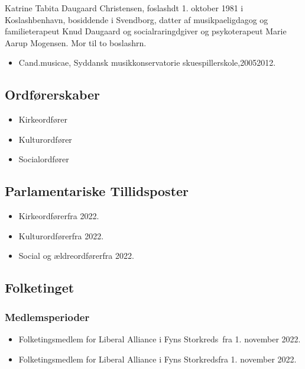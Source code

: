 \documentclass[11pt, a4paper]{awesome-cv}
\begin{document}
\makecvheader[R]
\makelettertitle
\begin{cvletter}
Katrine Tabita Daugaard Christensen, foslashdt 1. oktober 1981 i Koslashbenhavn, bosiddende i Svendborg, datter af musikpaeligdagog og familieterapeut Knud Daugaard og socialraringdgiver og psykoterapeut Marie Aarup Mogensen. Mor til to boslashrn.

\begin{itemize}
\item Cand.musicae, Syddansk musikkonservatorie  skuespillerskole,20052012.
\end{itemize}
\subsection*{Ordførerskaber}
\begin{itemize}
\item Kirkeordfører
\item Kulturordfører
\item Socialordfører
\end{itemize}
\subsection*{Parlamentariske Tillidsposter}
\begin{itemize}
\item Kirkeordførerfra 2022.
\item Kulturordførerfra 2022.
\item Social og ældreordførerfra 2022.
\end{itemize}
\subsection*{Folketinget}
\subsubsection*{Medlemsperioder}
\begin{itemize}
\item Folketingsmedlem for Liberal Alliance i Fyns Storkreds fra 1. november 2022.
\item Folketingsmedlem for Liberal Alliance i Fyns Storkredsfra 1. november 2022.
\end{itemize}

\end{cvletter}
\end{document}
